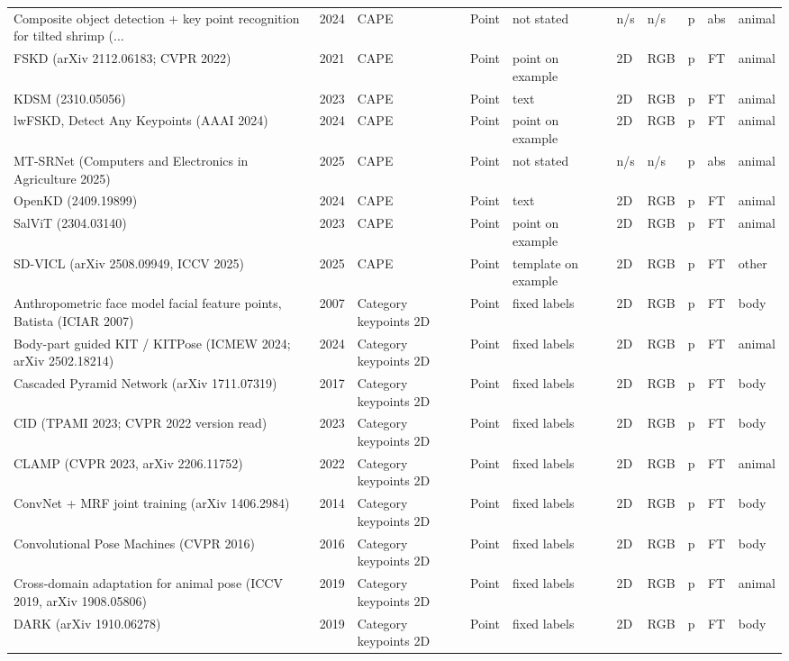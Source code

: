 {\begin{landscape}
\begin{longtable}{@{}p{4.6cm}rp{2.0cm}lllllcl@{}}
Composite object detection + key point recognition for tilted shrimp (... & 2024 & CAPE & Point & not stated & n/s & n/s & p & abs & animal \\
FSKD (arXiv 2112.06183; CVPR 2022) & 2021 & CAPE & Point & point on example & 2D & RGB & p & FT & animal \\
KDSM (2310.05056) & 2023 & CAPE & Point & text & 2D & RGB & p & FT & animal \\
lwFSKD, Detect Any Keypoints (AAAI 2024) & 2024 & CAPE & Point & point on example & 2D & RGB & p & FT & animal \\
MT-SRNet (Computers and Electronics in Agriculture 2025) & 2025 & CAPE & Point & not stated & n/s & n/s & p & abs & animal \\
OpenKD (2409.19899) & 2024 & CAPE & Point & text & 2D & RGB & p & FT & animal \\
SalViT (2304.03140) & 2023 & CAPE & Point & point on example & 2D & RGB & p & FT & animal \\
SD-VICL (arXiv 2508.09949, ICCV 2025) & 2025 & CAPE & Point & template on example & 2D & RGB & p & FT & other \\
Anthropometric face model facial feature points, Batista (ICIAR 2007) & 2007 & Category keypoints 2D & Point & fixed labels & 2D & RGB & p & FT & body \\
Body-part guided KIT / KITPose (ICMEW 2024; arXiv 2502.18214) & 2024 & Category keypoints 2D & Point & fixed labels & 2D & RGB & p & FT & animal \\
Cascaded Pyramid Network (arXiv 1711.07319) & 2017 & Category keypoints 2D & Point & fixed labels & 2D & RGB & p & FT & body \\
CID (TPAMI 2023; CVPR 2022 version read) & 2023 & Category keypoints 2D & Point & fixed labels & 2D & RGB & p & FT & body \\
CLAMP (CVPR 2023, arXiv 2206.11752) & 2022 & Category keypoints 2D & Point & fixed labels & 2D & RGB & p & FT & animal \\
ConvNet + MRF joint training (arXiv 1406.2984) & 2014 & Category keypoints 2D & Point & fixed labels & 2D & RGB & p & FT & body \\
Convolutional Pose Machines (CVPR 2016) & 2016 & Category keypoints 2D & Point & fixed labels & 2D & RGB & p & FT & body \\
Cross-domain adaptation for animal pose (ICCV 2019, arXiv 1908.05806) & 2019 & Category keypoints 2D & Point & fixed labels & 2D & RGB & p & FT & animal \\
DARK (arXiv 1910.06278) & 2019 & Category keypoints 2D & Point & fixed labels & 2D & RGB & p & FT & body \\

\end{longtable}
\end{landscape}}

